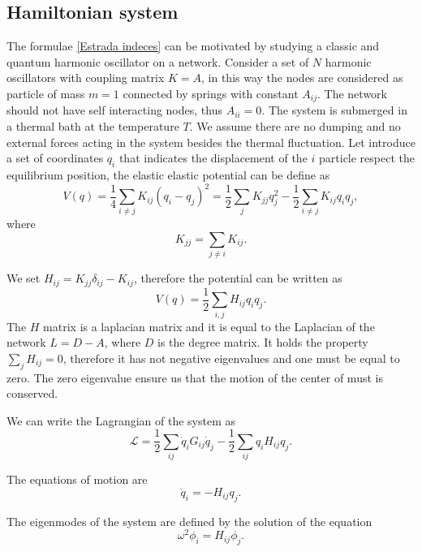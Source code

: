 \subsection{Hamiltonian system}
The formulae \eqref{Estrada indeces} can be motivated by studying a classic and quantum harmonic oscillator on a network.
Consider a set of $N$ harmonic oscillators with coupling matrix $K = A$, in this way the nodes are considered as particle of mass $m = 1$ connected by springs with constant $A_{ij}$. The network should not have self interacting nodes, thus $A_{ii} = 0$. The system is submerged in a thermal bath at the temperature $T$. We assume there are no dumping and no external forces acting in the system besides the thermal fluctuation. 
Let introduce a set of coordinates $q_i$ that indicates the displacement of the $i$ particle respect the equilibrium position, the elastic elastic potential can be define as
\begin{equation}
    V(q) = \frac{1}{4}\sum_{i\neq j} K_{ij}(q_i-q_j)^2 = \frac{1}{2}\sum_{j}K_{jj}q_j^2 - \frac{1}{2} \sum_{i\neq j}K_{ij}q_iq_j,
\end{equation}
where 
\begin{equation}
    K_{jj} = \sum_{j \neq i} K_{ij}.
\end{equation}

We set $H_{ij}= K_{jj}\delta_{ij} - K_{ij}$, therefore the potential can be written as
\begin{equation}
    V(q) = \frac{1}{2}\sum_{i,j} H_{ij} q_i q_j.
\end{equation}
The $H$ matrix is a laplacian matrix and it is equal to the Laplacian of the network $L = D - A$, where $D$ is the degree matrix. It holds the property $\sum_j H_{ij} = 0$, therefore it has not negative eigenvalues and one must be equal to zero.
The zero eigenvalue ensure us that the motion of the center of must is conserved. %

We can write the Lagrangian of the system as
\begin{equation}
    \mathcal{L} = \frac{1}{2}\sum_{ij} \dot q_i G_{ij} \dot q_j - \frac{1}{2} \sum_{ij} q_iH_{ij}q_j.
\end{equation}

The equations of motion are
\begin{equation}
    \ddot q_i = -H_{ij} q_j.
\end{equation}

The eigenmodes of the system are defined by the solution of the equation 
\begin{equation}
    \omega^2 \phi_i = H_{ij} \phi_j.
\end{equation}

